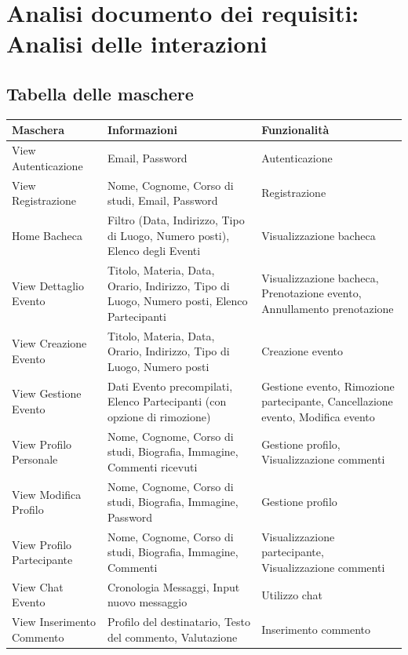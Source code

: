 \documentclass[12pt,a4paper]{report}
\begin{document}
\newpage
\section{Analisi documento dei requisiti: Analisi delle interazioni}

\subsection{Tabella delle maschere}
\begin{tabularx}{\textwidth}{|p{4.5cm}|X|p{4cm}|}
    \hline
    \rowcolor{studyColor} \textbf{Maschera} & \textbf{Informazioni} & \textbf{Funzionalità} \\ \hline
    \endhead
    View Autenticazione & Email, Password & Autenticazione \\ \hline
    View Registrazione & Nome, Cognome, Corso di studi, Email, Password & Registrazione \\ \hline
    Home Bacheca & Filtro (Data, Indirizzo, Tipo di Luogo, Numero posti), Elenco degli Eventi & Visualizzazione bacheca \\ \hline
    View Dettaglio Evento & Titolo, Materia, Data, Orario, Indirizzo, Tipo di Luogo, Numero posti, Elenco Partecipanti & Visualizzazione bacheca, Prenotazione evento, Annullamento prenotazione \\ \hline
    View Creazione Evento & Titolo, Materia, Data, Orario, Indirizzo, Tipo di Luogo, Numero posti & Creazione evento \\ \hline
    View Gestione Evento & Dati Evento precompilati, Elenco Partecipanti (con opzione di rimozione) & Gestione evento, Rimozione partecipante, Cancellazione evento, Modifica evento \\ \hline
    View Profilo Personale & Nome, Cognome, Corso di studi, Biografia, Immagine, Commenti ricevuti & Gestione profilo, Visualizzazione commenti \\ \hline
    View Modifica Profilo & Nome, Cognome, Corso di studi, Biografia, Immagine, Password & Gestione profilo \\ \hline
    View Profilo Partecipante & Nome, Cognome, Corso di studi, Biografia, Immagine, Commenti & Visualizzazione partecipante, Visualizzazione commenti \\ \hline
    View Chat Evento & Cronologia Messaggi, Input nuovo messaggio & Utilizzo chat \\ \hline
    View Inserimento Commento & Profilo del destinatario, Testo del commento, Valutazione & Inserimento commento \\ \hline
\end{tabularx}
\end{document}
